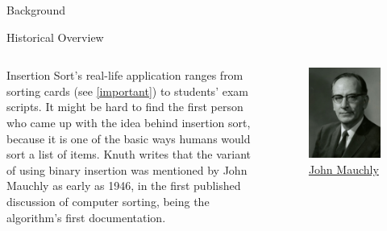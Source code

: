 \documentclass[12pt, aspectratio=54, xcolor=table]{beamer}
\begin{document}
\begin{frame}{Background}
\begin{structure}{\Large Historical Overview}
\vspace{14pt}
\begin{columns}

    \small{Insertion Sort's real-life application ranges from sorting cards (see \ref{important}) to students' exam scripts. It might be hard to find the first person who came up with the idea behind insertion sort, because it is one of the basic ways humans would sort a list of items.}
     \small{Knuth \cite{donald1999art} writes that the variant of using binary insertion was mentioned by John Mauchly as early as 1946, in the first published discussion of computer sorting, being the algorithm's first documentation.}
    \begin{figure}
        \centering
         \includegraphics[scale=0.065]{images/johnmauchly.jpg}
        \caption*{\href{https://en.wikipedia.org/wiki/John_Mauchly}{John Mauchly}}
        \label{fig:2}
    \end{figure}
   
\end{columns}
\end{structure}
    
\end{frame}
\end{document}
